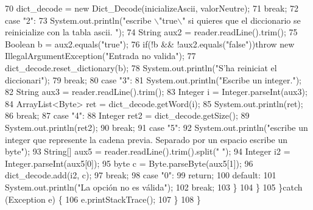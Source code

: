\begin{DoxyCode}
70                     dict\_decode = \textcolor{keyword}{new} Dict\_Decode(inicializeAscii, valorNeutre);
71                 \textcolor{keywordflow}{break};
72                 \textcolor{keywordflow}{case} \textcolor{stringliteral}{"2"}:
73                     System.out.println(\textcolor{stringliteral}{"escribe \(\backslash\)"true\(\backslash\)" si quieres que el diccionario se reinicialize con
       la tabla ascii. "});
74                     String aux2 = reader.readLine().trim();
75                     Boolean b = aux2.equals(\textcolor{stringliteral}{"true"});
76                     \textcolor{keywordflow}{if}(!b && !aux2.equals(\textcolor{stringliteral}{"false"}))\textcolor{keywordflow}{throw} \textcolor{keyword}{new} IllegalArgumentException(\textcolor{stringliteral}{"Entrada no valida"});
77                     dict\_decode.reset\_dictionary(b);
78                     System.out.println(\textcolor{stringliteral}{"S'ha reiniciat el diccionari"});
79                 \textcolor{keywordflow}{break};
80                 \textcolor{keywordflow}{case} \textcolor{stringliteral}{"3"}:
81                     System.out.println(\textcolor{stringliteral}{"Escribe un integer."});
82                     String aux3 = reader.readLine().trim();
83                     Integer i = Integer.parseInt(aux3);
84                     ArrayList<Byte> ret = dict\_decode.getWord(i);
85                     System.out.println(ret);
86                 \textcolor{keywordflow}{break};
87                 \textcolor{keywordflow}{case} \textcolor{stringliteral}{"4"}:
88                     Integer ret2 = dict\_decode.getSize();
89                     System.out.println(ret2);
90                 \textcolor{keywordflow}{break};
91                 \textcolor{keywordflow}{case} \textcolor{stringliteral}{"5"}:
92                     System.out.println(\textcolor{stringliteral}{"escribe un integer que represente la cadena previa. Separado por un
       espacio escribe un byte"});
93                     String[] aux5 = reader.readLine().trim().split(\textcolor{stringliteral}{" "});
94                     Integer i2 = Integer.parseInt(aux5[0]);
95                     byte c = Byte.parseByte(aux5[1]);
96                     dict\_decode.add(i2, c);
97                 \textcolor{keywordflow}{break};
98                 \textcolor{keywordflow}{case} \textcolor{stringliteral}{"0"}:
99                     \textcolor{keywordflow}{return};
100                 \textcolor{keywordflow}{default}:
101                     System.out.println(\textcolor{stringliteral}{"La opción no es válida"});
102                 \textcolor{keywordflow}{break};
103             \}
104         \}
105     \}\textcolor{keywordflow}{catch} (Exception e) \{
106         e.printStackTrace();
107     \}
108     \}
\end{DoxyCode}
\mbox{\label{classdomini_1_1utils_1_1Driver____Dict__Decode_af3ae63bfc55ea99e468d6c9c86ec26c9}} 
